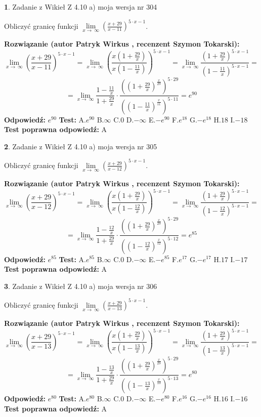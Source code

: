 \documentclass[12pt, a4paper]{article}
\theoremstyle{definition} %
\newtheorem{zad}{}
\newcommand{\zadStart}[1]{\begin{zad}#1\newline}
\newcommand{\zadStop}{\end{zad}}
\newcommand{\rozwStart}[2]{\noindent \textbf{Rozwiązanie (autor #1 , recenzent #2): }\newline}
\newcommand{\rozwStop}{\newline}
\newcommand{\odpStart}{\noindent \textbf{Odpowiedź:}\newline}
\newcommand{\odpStop}{\newline}
\newcommand{\testStart}{\noindent \textbf{Test:}\newline}
\newcommand{\testStop}{\newline}
\newcommand{\kluczStart}{\noindent \textbf{Test poprawna odpowiedź:}\newline}
\newcommand{\kluczStop}{\newline}
\begin{document}
\zadStart{Zadanie z Wikieł Z 4.10 a) moja wersja nr 304}

Obliczyć granicę funkcji  $\lim\limits_{x\to\ \infty}(\frac{x+29}{x-11})^{5\cdot x-1}$.
\zadStop
\rozwStart{Patryk Wirkus}{Szymon Tokarski}
$$\lim\limits_{x\to\ \infty}(\frac{x+29}{x-11})^{5\cdot x-1} = \lim\limits_{x\to\ \infty}(\frac{x(1+\frac{29}{x})}{x(1-\frac{11}{x})})^{5\cdot x-1}=\lim\limits_{x\to\ \infty}\frac{(1+\frac{29}{x})^{5\cdot x-1}}{(1-\frac{11}{x})^{5\cdot x-1}}=$$
$$=\lim\limits_{x\to\ \infty}\frac{1-\frac{11}{x}}{1+\frac{29}{x}}\cdot\frac{((1+\frac{29}{x})^{\frac{x}{29}})^{5\cdot29}}{((1-\frac{11}{x})^{\frac{x}{11}})^{5\cdot11}}=e^{90}$$
\rozwStop
\odpStart
$e^{90}$
\odpStop
\testStart
A.$e^{90}$ B.$\infty$ C.$0$ D.$-\infty$ E.$-e^{90}$
F.$e^{18}$ G.$-e^{18}$
H.$18$
I.$-18$
\testStop
\kluczStart
A
\kluczStop



\zadStart{Zadanie z Wikieł Z 4.10 a) moja wersja nr 305}

Obliczyć granicę funkcji  $\lim\limits_{x\to\ \infty}(\frac{x+29}{x-12})^{5\cdot x-1}$.
\zadStop
\rozwStart{Patryk Wirkus}{Szymon Tokarski}
$$\lim\limits_{x\to\ \infty}(\frac{x+29}{x-12})^{5\cdot x-1} = \lim\limits_{x\to\ \infty}(\frac{x(1+\frac{29}{x})}{x(1-\frac{12}{x})})^{5\cdot x-1}=\lim\limits_{x\to\ \infty}\frac{(1+\frac{29}{x})^{5\cdot x-1}}{(1-\frac{12}{x})^{5\cdot x-1}}=$$
$$=\lim\limits_{x\to\ \infty}\frac{1-\frac{12}{x}}{1+\frac{29}{x}}\cdot\frac{((1+\frac{29}{x})^{\frac{x}{29}})^{5\cdot29}}{((1-\frac{12}{x})^{\frac{x}{12}})^{5\cdot12}}=e^{85}$$
\rozwStop
\odpStart
$e^{85}$
\odpStop
\testStart
A.$e^{85}$ B.$\infty$ C.$0$ D.$-\infty$ E.$-e^{85}$
F.$e^{17}$ G.$-e^{17}$
H.$17$
I.$-17$
\testStop
\kluczStart
A
\kluczStop



\zadStart{Zadanie z Wikieł Z 4.10 a) moja wersja nr 306}

Obliczyć granicę funkcji  $\lim\limits_{x\to\ \infty}(\frac{x+29}{x-13})^{5\cdot x-1}$.
\zadStop
\rozwStart{Patryk Wirkus}{Szymon Tokarski}
$$\lim\limits_{x\to\ \infty}(\frac{x+29}{x-13})^{5\cdot x-1} = \lim\limits_{x\to\ \infty}(\frac{x(1+\frac{29}{x})}{x(1-\frac{13}{x})})^{5\cdot x-1}=\lim\limits_{x\to\ \infty}\frac{(1+\frac{29}{x})^{5\cdot x-1}}{(1-\frac{13}{x})^{5\cdot x-1}}=$$
$$=\lim\limits_{x\to\ \infty}\frac{1-\frac{13}{x}}{1+\frac{29}{x}}\cdot\frac{((1+\frac{29}{x})^{\frac{x}{29}})^{5\cdot29}}{((1-\frac{13}{x})^{\frac{x}{13}})^{5\cdot13}}=e^{80}$$
\rozwStop
\odpStart
$e^{80}$
\odpStop
\testStart
A.$e^{80}$ B.$\infty$ C.$0$ D.$-\infty$ E.$-e^{80}$
F.$e^{16}$ G.$-e^{16}$
H.$16$
I.$-16$
\testStop
\kluczStart
A
\kluczStop
\end{document}
